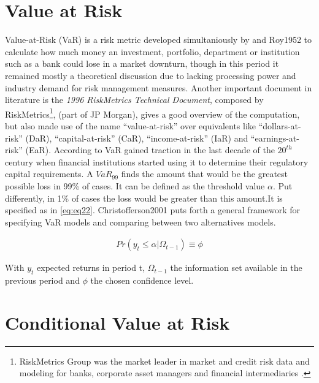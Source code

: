 \documentclass[a4paper, nobind]{templates/ociamthesis}
\begin{document}
\hypertarget{value-at-risk}{%
\section{Value at Risk}\label{value-at-risk}}

Value-at-Risk (VaR) is a risk metric developed simultaniously by \textcite{markowitz1952} and Roy1952 to calculate how much money an investment, portfolio, department or institution such as a bank could lose in a market downturn, though in this period it remained mostly a theoretical discussion due to lacking processing power and industry demand for risk management measures. Another important document in literature is the \emph{1996 RiskMetrics Technical Document}, composed by RiskMetrics\footnote{RiskMetrics Group was the market leader in market and credit risk data and modeling for banks, corporate asset managers and financial intermediaries \autocite{alexander2008}.}, \textcite{morganguarantytrustcompany1996} (part of JP Morgan), gives a good overview of the computation, but also made use of the name ``value-at-risk'' over equivalents like ``dollars-at-risk'' (DaR), ``capital-at-risk'' (CaR), ``income-at-risk'' (IaR) and ``earnings-at-risk'' (EaR). According to \textcite{holton2002} VaR gained traction in the last decade of the \(20^{th}\) century when financial institutions started using it to determine their regulatory capital requirements. A \(VaR_{99}\) finds the amount that would be the greatest possible loss in 99\% of cases. It can be defined as the threshold value \(\alpha\). Put differently, in 1\% of cases the loss would be greater than this amount.It is specified as in \eqref{eq:eq22}. Christofferson2001 puts forth a general framework for specifying VaR models and comparing between two alternatives models.

\begin{align}
Pr(y_t \le \alpha | \Omega_{t-1}) \equiv \phi
 \label{eq:eq22}
\end{align}

With \(y_t\) expected returns in period t, \(\Omega_{t-1}\) the information set available in the previous period and \(\phi\) the chosen confidence level.

\hypertarget{conditional-value-at-risk}{%
\section{Conditional Value at Risk}\label{conditional-value-at-risk}}
\end{document}

